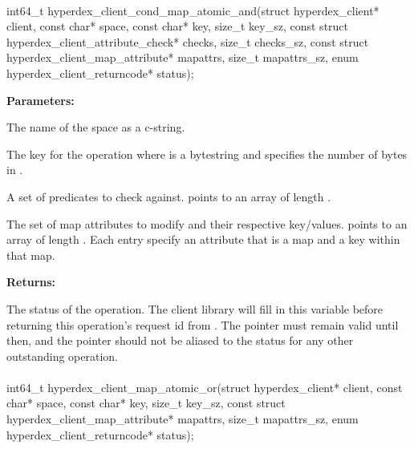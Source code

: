 \paragraph{}
\label{api:c:cond_map_atomic_and}
\begin{ccode}
int64_t hyperdex_client_cond_map_atomic_and(struct hyperdex_client* client,
        const char* space,
        const char* key, size_t key_sz,
        const struct hyperdex_client_attribute_check* checks, size_t checks_sz,
        const struct hyperdex_client_map_attribute* mapattrs, size_t mapattrs_sz,
        enum hyperdex_client_returncode* status);
\end{ccode}
\funcdesc 

\noindent\textbf{Parameters:}
\begin{description}[labelindent=\widthof{{\code{mapattrs}, \code{mapattrs\_sz}}},leftmargin=*,noitemsep,nolistsep,align=right]
\item[\code{space}] The name of the space as a c-string.
\item[\code{key}, \code{key\_sz}] The key for the operation where  is a bytestring and  specifies the number of bytes in .
\item[\code{checks}, \code{checks\_sz}] A set of predicates to check against.   points to an array of length .
\item[\code{mapattrs}, \code{mapattrs\_sz}] The set of map attributes to modify and their respective key/values.   points to an array of length .  Each entry specify an attribute that is a map and a key within that map.
\end{description}

\noindent\textbf{Returns:}
\begin{description}[labelindent=\widthof{{\code{status}}},leftmargin=*,noitemsep,nolistsep,align=right]
\item[\code{status}] The status of the operation.  The client library will fill in this variable before returning this operation's request id from .  The pointer must remain valid until then, and the pointer should not be aliased to the status for any other outstanding operation.
\end{description}

\paragraph{}
\label{api:c:map_atomic_or}
\begin{ccode}
int64_t hyperdex_client_map_atomic_or(struct hyperdex_client* client,
        const char* space,
        const char* key, size_t key_sz,
        const struct hyperdex_client_map_attribute* mapattrs, size_t mapattrs_sz,
        enum hyperdex_client_returncode* status);
\end{ccode}
\funcdesc 

